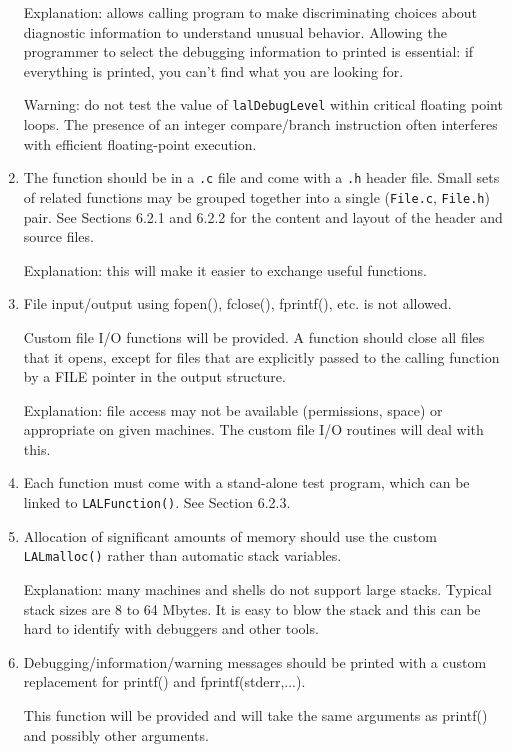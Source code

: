 \documentclass[]{ligodcc}
\begin{document}
\begin{enumerate}
Explanation: allows calling program to make discriminating choices
about diagnostic information to understand unusual behavior. Allowing
the programmer to  select the debugging information to printed is
essential: if everything is printed, you can't  find what you are
looking for.

Warning: do not test the value of {\tt lalDebugLevel} within critical
floating point loops. The presence of an integer compare/branch
instruction often interferes with efficient floating-point execution.

\item
The function should be in a {\tt .c} file and come with a {\tt .h} header
file.  Small sets of related functions may be grouped together into a
single ({\tt File.c}, {\tt File.h}) pair.  See Sections  6.2.1 and 6.2.2 for the
content and layout of the header and source files.

Explanation: this will make it easier to exchange useful functions.

\item
File input/output using fopen(), fclose(), fprintf(), etc. is
not allowed.

Custom file I/O functions will be provided. A function should close
all files that it opens, except for files that are explicitly passed
to the calling function by a FILE pointer in the output structure.

Explanation: file access may not be available (permissions, space) or
appropriate on given machines. The custom file I/O routines will deal
with this.

\item
Each function must come with a stand-alone test program, which
can be linked to {\tt LALFunction()}.  See Section 6.2.3.

\item
Allocation of significant amounts of memory should use the
custom {\tt LALmalloc()} rather than automatic stack variables.

Explanation: many machines and shells do not support large stacks.
Typical stack sizes are 8 to 64 Mbytes. It is easy to blow the stack
and this can be hard to identify with debuggers and other tools.

\item
Debugging/information/warning messages should be printed with
a custom replacement for printf() and fprintf(stderr,...).

This function will be provided and will take the same arguments as
printf() and possibly other arguments.


\end{enumerate}
\end{document}
